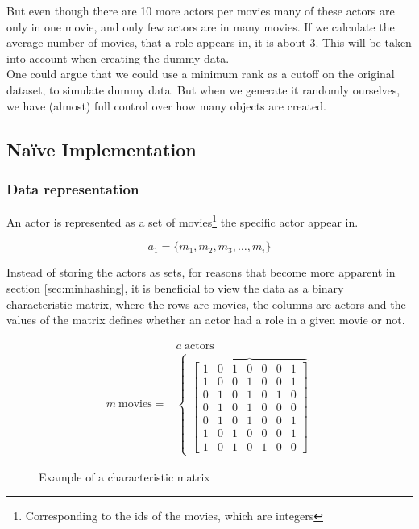 \documentclass[a4paper,11pt]{article}
\begin{document}
But even though there are 10 more actors per movies many of these actors are only in one movie, and only few actors are in many movies. If we calculate the average number of movies, that a role appears in, it is about 3. This will be taken into account when creating the dummy data. \\

One could argue that we could use a minimum rank as a cutoff on the original dataset, to simulate dummy data. But when we generate it randomly ourselves, we have (almost) full control over how many objects are created. \\


\subsection{Naïve Implementation}


\subsubsection{Data representation}
An actor is represented as a set of movies\footnote{Corresponding to the ids of the movies, which are integers} the specific actor appear in.

\begin{equation}
a_1 = \{m_1, m_2, m_3, \ldots , m_i\}
\end{equation}

Instead of storing the actors as sets, for reasons that become more apparent in section \ref{sec:minhashing}, it is beneficial to view the data as a binary characteristic matrix, where the rows are movies, the columns are actors and the values of the matrix defines whether an actor had a role in a given movie or not.\\ 

\begin{figure}[!htbp]
\begin{eqnarray*}
 & a \ \text{actors} \\
 m \ \text{movies} = & 
\begin{cases}
    \overbrace{
    \begin{bmatrix}
        1 & 0 & 1 & 0 & 0 & 0 & 1\\
        1 & 0 & 0 & 1 & 0 & 0 & 1\\
        0 & 1 & 0 & 1 & 0 & 1 & 0\\
        0 & 1 & 0 & 1 & 0 & 0 & 0\\
        0 & 1 & 0 & 1 & 0 & 0 & 1\\
        1 & 0 & 1 & 0 & 0 & 0 & 1\\
        1 & 0 & 1 & 0 & 1 & 0 & 0
    \end{bmatrix} 
    }
\end{cases}
\end{eqnarray*}
\caption{Example of a characteristic matrix}
\label{fig:char_matrix}
\end{figure}
\end{document}
